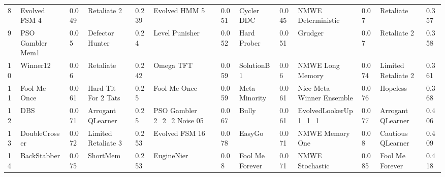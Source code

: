 \begin{tabular}{lllllllllllll}
8  &            Evolved FSM 4 &     0.049 &            Retaliate 2 &     0.239 &               Evolved HMM 5 &     0.051 &         Cycler DDC &     0.045 &         NMWE Deterministic &      0.07 &            Retaliate &     0.357 \\
9  &         PSO Gambler Mem1 &      0.05 &        Defector Hunter &      0.24 &              Level Punisher &     0.052 &        Hard Prober &     0.051 &                    Grudger &      0.07 &          Retaliate 2 &     0.358 \\
10 &                 Winner12 &      0.06 &              Retaliate &     0.242 &                   Omega TFT &     0.059 &         SolutionB1 &      0.06 &           NMWE Long Memory &     0.074 &  Limited Retaliate 2 &     0.361 \\
11 &             Fool Me Once &     0.061 &    Hard Tit For 2 Tats &      0.25 &                Fool Me Once &     0.059 &      Meta Minority &     0.061 &  Nice Meta Winner Ensemble &     0.076 &             Hopeless &     0.368 \\
12 &                      DBS &     0.071 &      Arrogant QLearner &      0.25 &  PSO Gambler 2\_2\_2 Noise 05 &     0.067 &              Bully &     0.061 &       EvolvedLookerUp1\_1\_1 &     0.077 &    Arrogant QLearner &     0.406 \\
13 &            DoubleCrosser &     0.072 &    Limited Retaliate 3 &     0.253 &              Evolved FSM 16 &     0.078 &             EasyGo &     0.071 &            NMWE Memory One &      0.08 &    Cautious QLearner &     0.409 \\
14 &              BackStabber &     0.075 &               ShortMem &     0.253 &                  EugineNier &      0.08 &    Fool Me Forever &     0.071 &            NMWE Stochastic &     0.085 &      Fool Me Forever &     0.418 \\
\bottomrule
\end{tabular}
